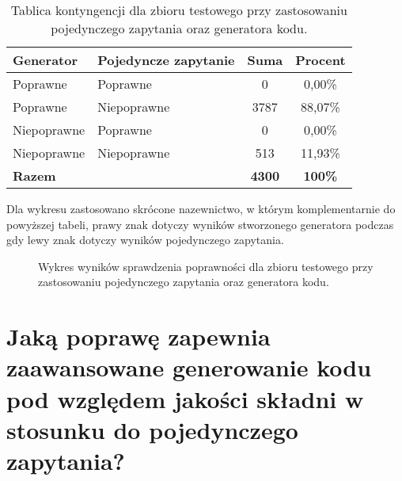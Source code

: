 \begin{table}[ht]
\caption{Tablica kontyngencji dla zbioru testowego przy zastosowaniu pojedynczego zapytania oraz generatora kodu.}\label{tab:tabela11}
\centering%
\begin{tabular}{|l|l|c|c|}
\hline
\textbf{Generator} & \textbf{Pojedyncze zapytanie} & \textbf{Suma} & \textbf{Procent} \\
\hline
Poprawne & Poprawne & 0 & 0,00\% \\
\hline
Poprawne & Niepoprawne & 3787 & 88,07\% \\
\hline
Niepoprawne & Poprawne & 0 & 0,00\% \\
\hline
Niepoprawne & Niepoprawne & 513 & 11,93\% \\
\hline
\textbf{Razem} & & \textbf{4300} & \textbf{100\%} \\
\hline
\end{tabular}
\end{table}

Dla wykresu zastosowano skrócone nazewnictwo, w którym komplementarnie do powyższej tabeli, prawy znak dotyczy wyników stworzonego generatora podczas gdy lewy znak dotyczy wyników pojedynczego zapytania.

\begin{figure}[H]
\centering
{}
\caption{Wykres wyników sprawdzenia poprawności dla zbioru testowego przy zastosowaniu pojedynczego zapytania oraz generatora kodu.}\label{rys:plama2k}
\end{figure}

\section{Jaką poprawę zapewnia zaawansowane generowanie kodu pod względem jakości składni w stosunku do pojedynczego zapytania?}

